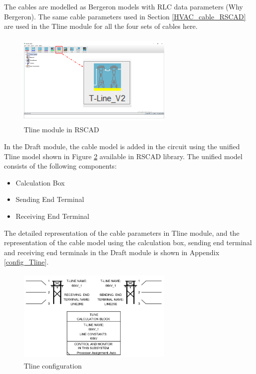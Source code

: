 The cables are modelled as Bergeron models with RLC data parameters (Why Bergeron). The same cable parameters used in Section \ref{HVAC_cable_RSCAD} are used in the Tline module for all the four sets of cables here. 
 
 \begin{figure}[H]
\centering
    \includegraphics[height = 4.5cm,width = 7.5cm]{Diagrams/Chapter_4/Tline_module_Final.png}
    \caption{Tline module in RSCAD}
    \label{fig:TlineModule_mark}
\end{figure}
 
 In the Draft module, the cable model is added in the circuit using the unified Tline model shown in Figure \ref{fig:Tline_calculationbox_RSCAD} available in RSCAD library. The unified model consists of the following components: 
    \begin{itemize}[noitemsep]
    \item Calculation Box
    \item Sending End Terminal
    \item Receiving End Terminal
\end{itemize}

The detailed representation of the cable parameters in Tline module, and the representation of the cable model using the calculation box, sending end terminal and receiving end terminals in the Draft module is shown in Appendix \ref{config_Tline}.

\begin{figure}[H]
  \centering
  \includegraphics[height = 4.5cm,width = 7.5cm]{Diagrams/Chapter_4/TlineParaBlock.PNG}  
  \caption{Tline configuration}
  \label{fig:Tline_calculationbox_RSCAD}
\end{figure}

